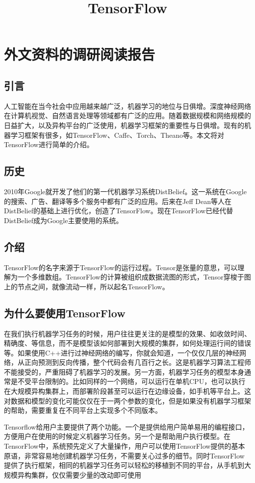 \chapter{外文资料的调研阅读报告}
\title{TensorFlow}

\section{引言}
人工智能在当今社会中应用越来越广泛，机器学习的地位与日俱增。深度神经网络在计算机视觉、自然语言处理等领域都有广泛的应用。随着数据规模和网络规模的日益扩大，以及异构平台的广泛使用，机器学习框架的重要性与日俱增。现有的机器学习框架有很多，如TensorFlow、Caffe、Torch、Theano等。本文将对TensorFlow进行简单的介绍。

\section{历史}
2010年Google就开发了他们的第一代机器学习系统DistBelief。这一系统在Google的搜索、广告、翻译等多个服务中都有广泛的应用。后来在Jeff Dean等人在DistBelief的基础上进行优化，创造了TensorFlow。现在TensorFlow已经代替DistBelief成为Google主要使用的系统。

\section{介绍}
TensorFlow的名字来源于TensorFlow的运行过程。Tensor是张量的意思，可以理解为一个多维数组。TensorFlow的计算被组织成数据流图的形式，Tensor穿梭于图上的节点之间，就像流动一样，所以起名TensorFlow。

\section{为什么要使用TensorFlow}
在我们执行机器学习任务的时候，用户往往更关注的是模型的效果、如收敛时间、精确度、等信息，而不是模型该如何部署到大规模的集群，如何处理运行间的错误等。如果使用C++进行过神经网络的编写，你就会知道，一个仅仅几层的神经网络，从正向预测到反向传播，整个代码会有几百行之长。这是机器学习算法工程师不能接受的，严重阻碍了机器学习的发展。另一方面，机器学习任务的模型本身通常是不受平台限制的。比如同样的一个网络，可以运行在单机CPU，也可以执行在大规模异构集群上，而部署阶段甚至可以运行在边缘设备，如手机等平台上。这对数据和模型的变化可能仅仅在于一两个参数的变化，但是如果没有机器学习框架的帮助，需要重复在不同平台上实现多个不同版本。

Tensorflow给用户主要提供了两个功能。一个是提供给用户简单易用的编程接口，方便用户在使用的时候定义机器学习任务。另一个是帮助用户执行模型。在TensorFlow中，系统预先定义了大量操作，用户可以使用TensorFlow提供的基本原语，非常容易地创建机器学习任务，不需要关心过多的细节。同时TensorFlow提供了执行框架，相同的机器学习任务可以轻松的移植到不同的平台，从手机到大规模异构集群，仅仅需要少量的改动即可使用

